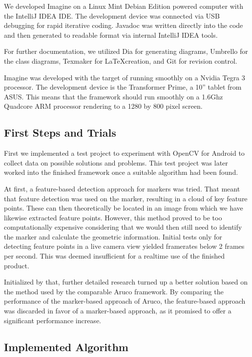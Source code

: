We developed Imagine on a Linux Mint Debian Edition powered computer with the IntelliJ IDEA IDE\cite{idea}.
The development device was connected via USB debugging for rapid iterative coding.
Javadoc was written directly into the code and then generated to readable format via internal IntelliJ IDEA tools.

For further documentation, we utilized Dia\cite{dia} for generating diagrams, Umbrello\cite{umbrello} for the class diagrams, Texmaker\cite{texmaker} for \LaTeX  creation, and Git\cite{git} for revision control.

Imagine was developed with the target of running smoothly on a Nvidia Tegra 3 processor.
The development device is the Transformer Prime, a 10'' tablet from ASUS\cite{devicedev}.
This means that the framework should run smoothly on a 1.6Ghz Quadcore ARM processor rendering to a 1280 by 800 pixel screen.

\subsection{First Steps and Trials}

First we implemented a test project to experiment with OpenCV for Android to collect data on possible solutions and problems.
This test project was later worked into the finished framework once a suitable algorithm had been found.

At first, a feature-based detection approach for markers was tried.
That meant that feature detection was used on the marker, resulting in a cloud of key feature points.
These can then theoretically be located in an image from which we have likewise extracted feature points.
However, this method proved to be too computationally expensive considering that we would then still need to identify the marker and calculate the geometric information.
Initial tests only for detecting feature points in a live camera view yielded framerates below 2 frames per second.
This was deemed insufficient for a realtime use of the finished product.

Initialized by that, further detailed research turned up a better solution based on the method used by the comparable Aruco\cite{aruco} framework.
By comparing the performance of the marker-based approach of Aruco, the feature-based approach was discarded in favor of a marker-based approach, as it promised to offer a significant performance increase.

\subsection{Implemented Algorithm}
\label{detection_workflow}


